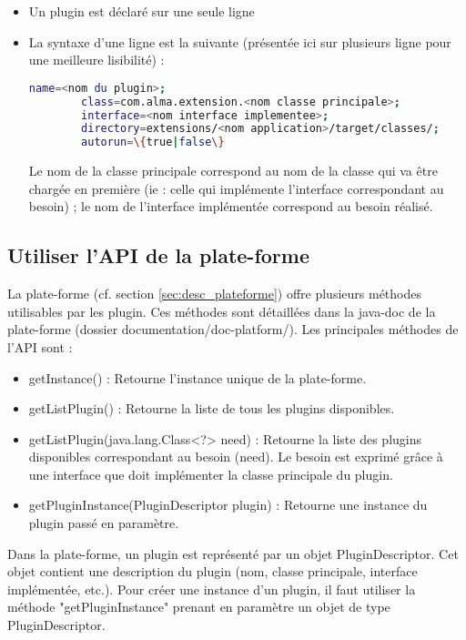     \begin{itemize}
        \item Un plugin est déclaré sur une seule ligne
        
        \item La syntaxe d'une ligne est la suivante (présentée ici sur plusieurs ligne pour une meilleure lisibilité) :
        \begin{lstlisting}[language=Bash,extendedchars=true]
        name=<nom du plugin>;
        class=com.alma.extension.<nom classe principale>;
        interface=<nom interface implementee>;
        directory=extensions/<nom application>/target/classes/;
        autorun=\{true|false\}
        \end{lstlisting}
        Le nom de la classe principale correspond au nom de la classe qui va être chargée en première (ie : celle qui implémente l'interface correspondant au besoin) ; le nom de l'interface implémentée correspond au besoin réalisé.
    \end{itemize}
    
\subsection{Utiliser l'API de la plate-forme}

    La plate-forme (cf. section \ref{sec:desc_plateforme}) offre plusieurs méthodes utilisables par les plugin. Ces méthodes sont détaillées dans la java-doc de la plate-forme (dossier documentation/doc-platform/). Les principales méthodes de l'API sont :
    
    \begin{itemize}
        \item getInstance() : Retourne l'instance unique de la plate-forme.
        \item getListPlugin() : Retourne la liste de tous les plugins disponibles.
        \item getListPlugin(java.lang.Class<?> need) : Retourne la liste des plugins disponibles correspondant au besoin (need). Le besoin est exprimé grâce à une interface que doit implémenter la classe principale du plugin.
        \item getPluginInstance(PluginDescriptor plugin) : Retourne une instance du plugin passé en paramètre.
    \end{itemize}
    
    Dans la plate-forme, un plugin est représenté par un objet PluginDescriptor. Cet objet contient une description du plugin (nom, classe principale, interface implémentée, etc.). Pour créer une instance d'un plugin, il faut utiliser la méthode "getPluginInstance" prenant en paramètre un objet de type PluginDescriptor.
    
